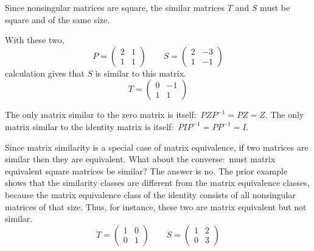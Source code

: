 
\noindent Since nonsingular matrices are square, 
the similar matrices $T$ and $S$ must
be square and of the same size.

\begin{example}
With these two,
\begin{equation*}
  P=
  \begin{pmatrix}
    2  &1  \\
    1  &1
  \end{pmatrix}
  \qquad
  S=
  \begin{pmatrix}
    2  &-3  \\
    1  &-1
  \end{pmatrix}
\end{equation*}
calculation gives that $S$ is similar to
this matrix.
\begin{equation*}
  T=
  \begin{pmatrix}
    0  &-1  \\
    1  &1
  \end{pmatrix}
\end{equation*}
\end{example}

\begin{example}  \label{ex:OnlyZeroSimToZero}
The only matrix similar to the zero matrix is itself:~$PZP^{-1}=PZ=Z$.
The only matrix similar to the identity matrix is 
itself:~$PIP^{-1}=PP^{-1}=I$.
\end{example}

Since matrix similarity is a special case of matrix equivalence, 
if two matrices are similar then they are equivalent.
What about the converse:~must matrix equivalent square matrices be similar?
The answer is no.
The prior example shows that the similarity classes are different
from the matrix equivalence classes, because the matrix equivalence class
of the identity consists of all nonsingular matrices of that size. 
Thus, for instance, these two are
matrix equivalent but not similar.
\begin{equation*}
  T=
  \begin{pmatrix}
    1  &0  \\
    0  &1
  \end{pmatrix}
  \qquad
  S=
  \begin{pmatrix}
    1  &2  \\
    0  &3
  \end{pmatrix}
\end{equation*}

